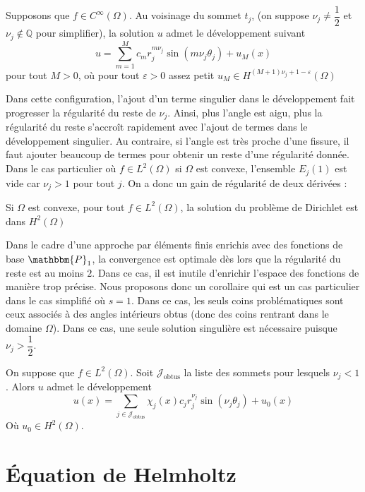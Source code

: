 \documentclass[11pt,a4paper]{article}
\begin{document}
\begin{Cor} Supposons que $f \in C^{\infty}(\Omega)$. Au voisinage du sommet $t_j$, (on suppose $\nu_j \neq \dfrac{1}{2}$ et $\nu_j \notin \mathbb{Q}$ pour simplifier), la solution $u$ admet le développement suivant 
\[ u = \sum_{m = 1}^{M} c_m r_j^{m \nu_j} \sin(m \nu_j \theta_j) + u_M(x)\]
pour tout $M>0$, où pour tout $\varepsilon>0$ assez petit $u_M \in H^{(M+1)\nu_j + 1 - \varepsilon}(\Omega)$
\end{Cor}
Dans cette configuration, l'ajout d'un terme singulier dans le développement fait progresser la régularité du reste de $\nu_j$. Ainsi, plus l'angle est aigu, plus la régularité du reste s'accroît rapidement avec l'ajout de termes dans le développement singulier. Au contraire, si l'angle est très proche d'une fissure, il faut ajouter beaucoup de termes pour obtenir un reste d'une régularité donnée. 
Dans le cas particulier où $f \in L^2(\Omega)$ si $\Omega$ est convexe,  l'ensemble $E_j(1)$ est vide car $\nu_j > 1$ pour tout $j$. On a donc un gain de régularité de deux dérivées : 
\begin{Cor} Si $\Omega$ est convexe, pour tout $f \in L^2(\Omega)$, la solution du problème de Dirichlet est dans  $H^{2}(\Omega)$
\end{Cor}
Dans le cadre d'une approche par éléments finis enrichis avec des fonctions de base $\mathbbm{P}_1$, la convergence est optimale dès lors que la régularité du reste est au moins $2$. Dans ce cas, il est inutile d'enrichir l'espace des fonctions de manière trop précise. Nous proposons donc un corollaire qui est un cas particulier dans le cas simplifié où $s=1$. Dans ce cas, les seuls coins problématiques sont ceux associés à des angles intérieurs obtus (donc des coins rentrant dans le domaine $\Omega$). Dans ce cas, une seule solution singulière est nécessaire puisque $\nu_j > \dfrac{1}{2}$. 
\begin{Cor} On suppose que $f \in L^2(\Omega)$. Soit $\mathcal{J}_{\text{obtus}}$ la liste des sommets pour lesquels $\nu_j < 1$. Alors $u$ admet le développement 
\[ u(x) = \sum_{j\in \mathcal{J}_{\text{obtus}}} \chi_j(x) c_j r_j^{\nu_j} \sin(\nu_j \theta_j)+ u_0(x)\] 
Où $u_0 \in H^2(\Omega)$.  
\end{Cor}




\section{Équation de Helmholtz}
\end{document}
